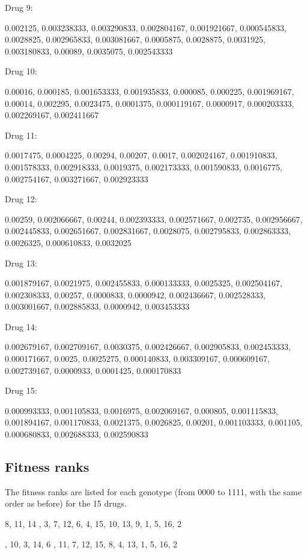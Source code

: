 \documentclass[12pt]{amsart}
\theoremstyle{plain}
\theoremstyle{definition}
\begin{document}
{\bigskip
Drug 9:

0.002125, 0.003238333, 0.003290833, 0.002804167, 0.001921667, 0.000545833, 0.0028825, 0.002965833, 0.003081667, 0.0005875, 0.0028875, 0.0031925, 0.003180833, 0.00089, 0.0035075, 0.002543333

\bigskip
Drug 10: 
     
0.00016, 0.000185, 0.001653333, 0.001935833, 0.000085, 0.000225, 0.001969167, 0.00014, 0.002295, 0.0023475, 0.0001375, 0.000119167, 0.0000917, 0.000203333, 0.002269167, 0.002411667

\newpage
Drug 11:

0.0017475, 0.0004225, 0.00294, 0.00207, 0.0017, 0.002024167, 0.001910833, 0.001578333, 0.002918333, 0.0019375, 0.002173333, 0.001590833, 0.0016775, 0.002754167, 0.003271667, 0.002923333

\bigskip
Drug 12:

0.00259, 0.002066667, 0.00244, 0.002393333, 0.002571667, 0.002735, 0.002956667, 0.002445833, 0.002651667, 0.002831667, 0.0028075, 0.002795833, 0.002863333, 0.0026325, 0.000610833, 0.0032025

\bigskip
Drug 13: 

0.001879167, 0.0021975, 0.002455833, 0.000133333, 0.0025325, 0.002504167, 0.002308333, 0.00257, 0.0000833, 0.0000942, 0.002436667,  0.002528333, 0.003001667, 0.002885833, 0.0000942, 0.003453333


\bigskip
Drug 14:

0.002679167, 0.002709167, 0.0030375, 0.002426667, 0.002905833, 0.002453333, 0.000171667, 0.0025, 0.0025275, 0.000140833, 0.003309167, 0.000609167, 0.002739167, 0.0000933, 0.0001425, 0.000170833

\bigskip
Drug 15:

0.000993333, 0.001105833, 0.0016975, 0.002069167, 0.000805, 0.001115833, 0.001894167, 0.001170833, 0.0021375, 0.0026825, 0.00201, 0.001103333, 0.001105, 0.000680833, 0.002688333, 0.002590833
 


\newpage
\subsection{Fitness ranks}
The fitness ranks are listed for each genotype (from 0000 to 1111, with the same order as before)
for the 15 drugs. 



8, 11,   14 , 3, 7, 12, 6, 4, 15, 10, 13, 9, 1, 5, 16, 2 

, 10, 3, 14, 6 , 11, 7, 12, 15, 8, 4, 13, 1, 5, 16, 2

}
\end{document}
